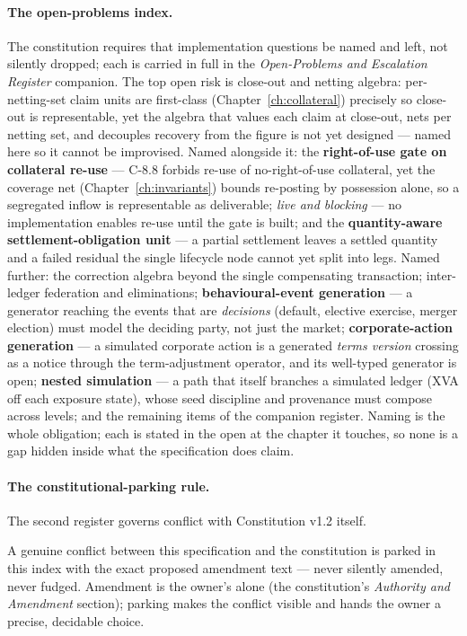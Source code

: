 \paragraph{The open-problems index.} The constitution requires that implementation
questions be named and left, not silently dropped; each is carried in full in the
\emph{Open-Problems and Escalation Register} companion. The top open risk is close-out and
netting algebra: per-netting-set claim units are first-class
(Chapter~\ref{ch:collateral}) precisely so close-out is representable, yet the algebra
that values each claim at close-out, nets per netting set, and decouples recovery from the
figure is not yet designed --- named here so it cannot be improvised. Named alongside it: the \textbf{right-of-use gate on collateral re-use} --- C-8.8 forbids
re-use of no-right-of-use collateral, yet the coverage net
(Chapter~\ref{ch:invariants}) bounds re-posting by possession alone, so a segregated
inflow is representable as deliverable; \emph{live and blocking} --- no implementation
enables re-use until the gate is built; and the \textbf{quantity-aware
settlement-obligation unit} --- a partial settlement leaves a settled quantity and a failed
residual the single lifecycle node cannot yet split into legs. Named further: the correction
algebra beyond the single compensating transaction; inter-ledger federation and
eliminations; \textbf{behavioural-event generation} --- a generator reaching the events
that are \emph{decisions} (default, elective exercise, merger election) must model the
deciding party, not just the market; \textbf{corporate-action generation} --- a simulated
corporate action is a generated \emph{terms version} crossing as a notice through the
term-adjustment operator, and its well-typed generator is open; \textbf{nested simulation}
--- a path that itself branches a simulated ledger (XVA off each exposure state), whose
seed discipline and provenance must compose across levels; and the remaining items of the
companion register. Naming
is the whole obligation; each is stated in the open at the chapter it touches, so none is a
gap hidden inside what the specification does claim.

\paragraph{The constitutional-parking rule.} The second register governs conflict with
Constitution v1.2 itself.

\begin{principle}
A genuine conflict between this specification and the constitution is parked in this index
with the exact proposed amendment text --- never silently amended, never fudged. Amendment
is the owner's alone (the constitution's \emph{Authority and Amendment} section); parking
makes the conflict visible and hands the owner a precise, decidable choice.
\end{principle}

